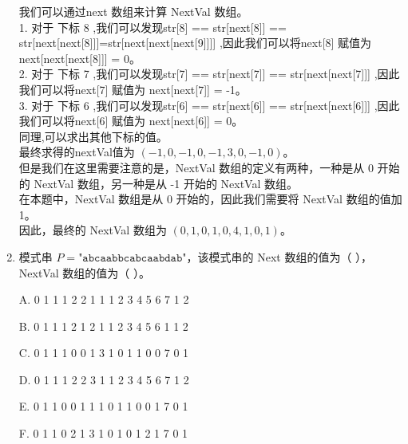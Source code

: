 \documentclass[lang=cn,newtx,10pt,scheme=chinese]{../../../elegantbook}
\begin{document}
\begin{enumerate}
    我们可以通过next 数组来计算 NextVal 数组。\\
    
    1. 对于 下标 8 ,我们可以发现str[8] == str[next[8]] == str[next[next[8]]]=str[next[next[next[9]]]] ,因此我们可以将next[8] 赋值为 next[next[next[8]]] = 0。\\

    2. 对于 下标 7 ,我们可以发现str[7] == str[next[7]] == str[next[next[7]]] ,因此我们可以将next[7] 赋值为 next[next[7]] = -1。\\
    3. 对于 下标 6 ,我们可以发现str[6] == str[next[6]] == str[next[next[6]]] ,因此我们可以将next[6] 赋值为 next[next[6]] = 0。\\

    同理,可以求出其他下标的值。\\

    最终求得的nextVal值为 $(-1,0,-1,0,-1,3,0,-1,0)$。\\
    但是我们在这里需要注意的是，NextVal 数组的定义有两种，一种是从 0 开始的 NextVal 数组，另一种是从 -1 开始的 NextVal 数组。\\
    在本题中，NextVal 数组是从 0 开始的，因此我们需要将 NextVal 数组的值加 1。\\
    因此，最终的 NextVal 数组为 $(0,1,0,1,0,4,1,0,1)$。\\

    \item 模式串 $P = \texttt{"abcaabbcabcaabdab"}$，该模式串的 Next 数组的值为（ ），NextVal 数组的值为（ ）。  
    
    A. 0 1 1 1 2 2 1 1 1 2 3 4 5 6 7 1 2 

    B. 0 1 1 1 2 1 2 1 1 2 3 4 5 6 1 1 2 

    C. 0 1 1 1 0 0 1 3 1 0 1 1 0 0 7 0 1 

    D. 0 1 1 1 2 2 3 1 1 2 3 4 5 6 7 1 2 

    E. 0 1 1 0 0 1 1 1 0 1 1 0 0 1 7 0 1 

    F. 0 1 1 0 2 1 3 1 0 1 0 1 2 1 7 0 1 


\end{enumerate}
\end{document}
